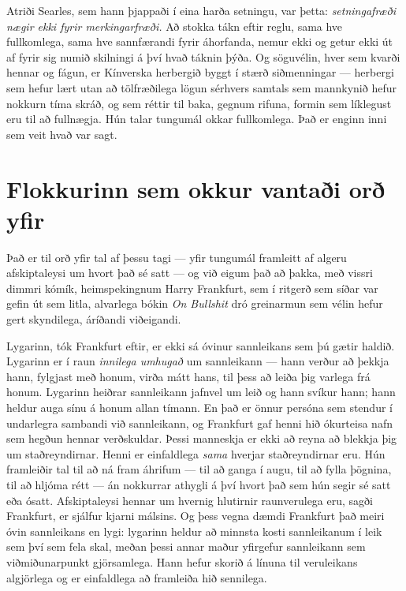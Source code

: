Atriði Searles, sem hann þjappaði í eina harða setningu, var þetta: \emph{setningafræði nægir ekki fyrir merkingarfræði.} Að stokka tákn eftir reglu, sama hve fullkomlega, sama hve sannfærandi fyrir áhorfanda, nemur ekki og getur ekki út af fyrir sig numið skilningi á því hvað táknin þýða. Og söguvélin, hver sem kvarði hennar og fágun, er Kínverska herbergið byggt í stærð siðmenningar — herbergi sem hefur lært utan að tölfræðilega lögun sérhvers samtals sem mannkynið hefur nokkurn tíma skráð, og sem réttir til baka, gegnum rifuna, formin sem líklegust eru til að fullnægja. Hún talar tungumál okkar fullkomlega. Það er enginn inni sem veit hvað var sagt.

\section*{Flokkurinn sem okkur vantaði orð yfir}

Það er til orð yfir tal af þessu tagi — yfir tungumál framleitt af algeru afskiptaleysi um hvort það sé satt — og við eigum það að þakka, með vissri dimmri kómík, heimspekingnum Harry Frankfurt, sem í ritgerð sem síðar var gefin út sem litla, alvarlega bókin \emph{On Bullshit} dró greinarmun sem vélin hefur gert skyndilega, áríðandi viðeigandi.

Lygarinn, tók Frankfurt eftir, er ekki sá óvinur sannleikans sem þú gætir haldið. Lygarinn er í raun \emph{innilega umhugað} um sannleikann — hann verður að þekkja hann, fylgjast með honum, virða mátt hans, til þess að leiða þig varlega frá honum. Lygarinn heiðrar sannleikann jafnvel um leið og hann svíkur hann; hann heldur auga sínu á honum allan tímann. En það er önnur persóna sem stendur í undarlegra sambandi við sannleikann, og Frankfurt gaf henni hið ókurteisa nafn sem hegðun hennar verðskuldar. Þessi manneskja er ekki að reyna að blekkja þig um staðreyndirnar. Henni er einfaldlega \emph{sama} hverjar staðreyndirnar eru. Hún framleiðir tal til að ná fram áhrifum — til að ganga í augu, til að fylla þögnina, til að hljóma rétt — án nokkurrar athygli á því hvort það sem hún segir sé satt eða ósatt. Afskiptaleysi hennar um hvernig hlutirnir raunverulega eru, sagði Frankfurt, er sjálfur kjarni málsins. Og þess vegna dæmdi Frankfurt það meiri óvin sannleikans en lygi: lygarinn heldur að minnsta kosti sannleikanum í leik sem því sem fela skal, meðan þessi annar maður yfirgefur sannleikann sem viðmiðunarpunkt gjörsamlega. Hann hefur skorið á línuna til veruleikans algjörlega og er einfaldlega að framleiða hið sennilega.

